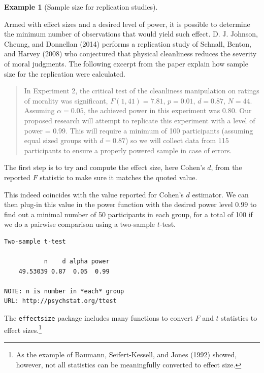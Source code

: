 \documentclass[
  11pt,
  letterpaper,
]{scrbook}
\theoremstyle{definition}
\theoremstyle{definition}
\newtheorem{example}{Example}[chapter]
\theoremstyle{remark}
\begin{document}
\begin{example}[Sample size for replication
studies]\protect\hypertarget{exm-power2}{}\label{exm-power2}

Armed with effect sizes and a desired level of power, it is possible to
determine the minimum number of observations that would yield such
effect. D. J. Johnson, Cheung, and Donnellan (2014) performs a
replication study of Schnall, Benton, and Harvey (2008) who conjectured
that physical cleanliness reduces the severity of moral judgments. The
following excerpt from the paper explain how sample size for the
replication were calculated.

\begin{quote}
In Experiment 2, the critical test of the cleanliness manipulation on
ratings of morality was significant, \(F(1, 41) = 7.81\), \(p=0.01\),
\(d=0.87\), \(N=44\). Assuming \(\alpha=0.05\), the achieved power in
this experiment was \(0.80\). Our proposed research will attempt to
replicate this experiment with a level of power = \(0.99\). This will
require a minimum of 100 participants (assuming equal sized groups with
\(d=0.87\)) so we will collect data from 115 participants to ensure a
properly powered sample in case of errors.
\end{quote}

The first step is to try and compute the effect size, here Cohen's
\(d\), from the reported \(F\) statistic to make sure it matches the
quoted value.

This indeed coincides with the value reported for Cohen's \(d\)
estimator. We can then plug-in this value in the power function with the
desired power level \(0.99\) to find out a minimal number of 50
participants in each group, for a total of 100 if we do a pairwise
comparison using a two-sample \(t\)-test.

\begin{verbatim}
Two-sample t-test

           n    d alpha power
    49.53039 0.87  0.05  0.99

NOTE: n is number in *each* group
URL: http://psychstat.org/ttest
\end{verbatim}

The \texttt{effectsize} package includes many functions to convert \(F\)
and \(t\) statistics to effect sizes.\footnote{As the example of
  Baumann, Seifert-Kessell, and Jones (1992) showed, however, not all
  statistics can be meaningfully converted to effect size.}

\end{example}
\end{document}
